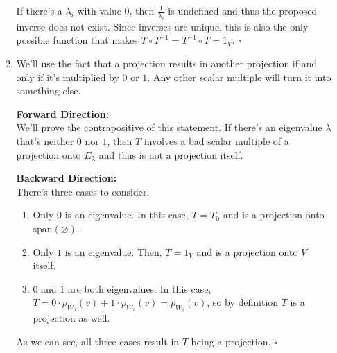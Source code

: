 \documentclass[12pt]{article}
\begin{document}
\begin{enumerate}
\begin{enumerate}
                        If there's a $\lambda_i$ with value $0$, then $\frac{1}{\lambda_i}$ is undefined
                        and thus the proposed inverse does not exist.
                        Since inverses are unique, this is also the only possible function that makes
                        $T \circ T^{-1}=T^{-1} \circ T=\mathrm{1}_V$. $\square$
                  \item We'll use the fact that a projection results in another projection if and only if
                        it's multiplied by $0$ or $1$.
                        Any other scalar multiple will turn it into something else.

                        \textbf{Forward Direction:} \\
                        We'll prove the contrapositive of this statement.
                        If there's an eigenvalue $\lambda$ that's neither $0$ nor $1$,
                        then $T$ involves a bad scalar multiple of a projection onto $E_{\lambda}$
                        and thus is not a projection itself.

                        \textbf{Backward Direction:} \\
                        There's three cases to consider.
                        \begin{enumerate}
                              \item Only $0$ is an eigenvalue.
                                    In this case, $T=T_0$ and is a projection onto $\text{span}(\varnothing)$.
                              \item Only $1$ is an eigenvalue.
                                    Then, $T=\mathrm{1}_V$ and is a projection onto $V$ itself.
                              \item $0$ and $1$ are both eigenvalues.
                                    In this case, $T=0 \cdot p_{W_0}(v)+1 \cdot p_{W_1}(v)=p_{W_1}(v)$,
                                    so by definition $T$ is a projection as well.
                        \end{enumerate}
                        As we can see, all three cases result in $T$ being a projection. $\square$
            \end{enumerate}
\end{enumerate}
\end{document}
